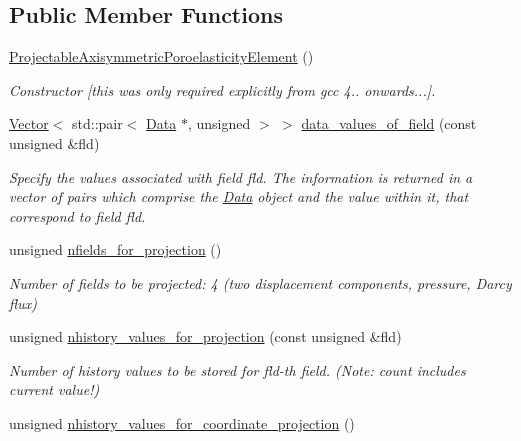 \subsection*{Public Member Functions}
\begin{DoxyCompactItemize}
\item 
\hyperlink{classoomph_1_1ProjectableAxisymmetricPoroelasticityElement_a346b0bf035991f172569177b1079d8c6}{Projectable\+Axisymmetric\+Poroelasticity\+Element} ()
\begin{DoxyCompactList}\small\item\em Constructor \mbox{[}this was only required explicitly from gcc 4.. onwards...\mbox{]}. \end{DoxyCompactList}\item 
\hyperlink{classoomph_1_1Vector}{Vector}$<$ std\+::pair$<$ \hyperlink{classoomph_1_1Data}{Data} $\ast$, unsigned $>$ $>$ \hyperlink{classoomph_1_1ProjectableAxisymmetricPoroelasticityElement_a1c98590aaf05d668c742afc430c0f5b6}{data\+\_\+values\+\_\+of\+\_\+field} (const unsigned \&fld)
\begin{DoxyCompactList}\small\item\em Specify the values associated with field fld. The information is returned in a vector of pairs which comprise the \hyperlink{classoomph_1_1Data}{Data} object and the value within it, that correspond to field fld. \end{DoxyCompactList}\item 
unsigned \hyperlink{classoomph_1_1ProjectableAxisymmetricPoroelasticityElement_a593b32549e17dedf66365bf3fd202536}{nfields\+\_\+for\+\_\+projection} ()
\begin{DoxyCompactList}\small\item\em Number of fields to be projected\+: 4 (two displacement components, pressure, Darcy flux) \end{DoxyCompactList}\item 
unsigned \hyperlink{classoomph_1_1ProjectableAxisymmetricPoroelasticityElement_afa3e26efcd834f12046852303709c4f7}{nhistory\+\_\+values\+\_\+for\+\_\+projection} (const unsigned \&fld)
\begin{DoxyCompactList}\small\item\em Number of history values to be stored for fld-\/th field. (Note\+: count includes current value!) \end{DoxyCompactList}\item 
unsigned \hyperlink{classoomph_1_1ProjectableAxisymmetricPoroelasticityElement_a077bea222dd174803e3af28e6995195e}{nhistory\+\_\+values\+\_\+for\+\_\+coordinate\+\_\+projection} ()

\end{DoxyCompactItemize}
